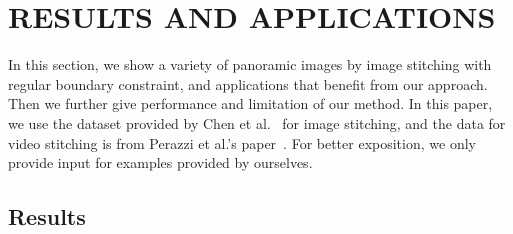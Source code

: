 \documentclass[10pt,journal,compsoc]{IEEEtran}
\begin{document}
\begin{comment}
Based on the piecewise rectangular boundary, we further optimize our image stitching by iterative optimization, as shown in Algorithm~\ref{alg:piecewise_rectangling}.
We first redefine the energy term $\phi_r$  in Equ.~\ref{equ:content_preserving_stitching} using the piecewise rectangular boundary constraint as
\begin{equation} \label{equ:piecewise_boundary}
\begin{split}
   &\widetilde{\phi_r}(\mathbf{V})=\sum\limits_{i=1}^4\sum\limits_{S^i_j \in \Re(i)}\sum\limits_{V_k \in S^i_j}|| \Lambda_{01}^i[\zeta[V_k] V_k+(1-\zeta[V_k])\\
   &(\kappa[V_k] \cdot \eta[V_k])]-S^i_j.val ||^2
\end{split}
\end{equation}

Then the energy function for rectangling stitching is redefined as
\begin{equation} \label{equ:piecewise_stitching}
\widetilde{\Phi}(\textbf{V})=\Phi_{stitch}(\textbf{V})+\gamma_r \widetilde{\phi_r}(\textbf{V})+\gamma_l \phi_l(\textbf{V}),
\end{equation}

\end{comment}

 \section{RESULTS AND APPLICATIONS}

In this section, we show a variety of panoramic images by image stitching with regular boundary constraint, and applications that benefit from our approach.
Then we further give performance and limitation of our method.
In this paper, we use the dataset provided by Chen et al.~\cite{conf/eccv/ChenC16} for image stitching, and the data for video stitching is from Perazzi et al.'s paper~\cite{journals/cgf/PerazziSZKWWG15}. For better exposition, we only provide input for examples provided by ourselves.

 \subsection{Results}
\end{document}
